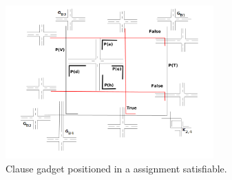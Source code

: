 \begin{figure}[htb]	
\center%
\includegraphics[width=8cm]{./img/clausulaGadgetGFCompletaSBPO.png}
\caption{Clause gadget positioned in a assignment satisfiable.}
\label{fig:clausulagadgetgf}
\end{figure}
